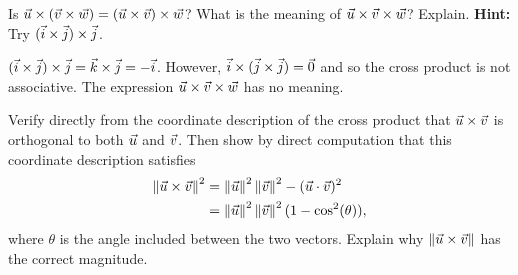\documentclass{ximera}
\author{Zack Reed}
\begin{document}
\begin{example}
    Is
    $\vec{u}\times (\vec{v}\times\vec{w}) = (\vec{u}\times
      \vec{v})\times\vec{w}$? What is the meaning of
    $\vec{u}\times \vec{v}\times\vec{w}$? Explain.  \textbf{Hint:}
    Try $(\vec{i}\times\vec{j})\times\vec{j}$.
    \begin{solution}
      $(\vec{i}\times\vec{j})\times\vec{j} = \vec{k}\times
      \vec{j}=-\vec{i}$. However,
      $\vec{i}\times(\vec{j}\times\vec{j}) = \vec{0}$ and so
      the cross product is not associative. The expression
      $\vec{u}\times\vec{v}\times\vec{w}$ has no meaning.
    \end{solution}
  \end{example}
  
  \begin{example}
    Verify directly from the coordinate description of the cross product
    that $\vec{u}\times \vec{v}$ is orthogonal to both $\vec{u}$ and
    $\vec{v}$. Then show by direct computation that this coordinate
    description satisfies
    \begin{align*}
      \left\|\vec{u}\times \vec{v}\right\|^2
      & =\left\|\vec{u}
        \right\|^2\left\|\vec{v}\right\|^2-(\vec{u}\cdot \vec{v})^2 \\
      & =\left\|\vec{u}\right\|^2\left\|\vec{v}\right\|^2(1-\cos^2(\theta)),
    \end{align*}
    where $\theta$ is the angle included between the two
    vectors. Explain why $\left\|\vec{u}\times\vec{v}\right\|$ has the
    correct magnitude.
  \end{example}
\end{document}

